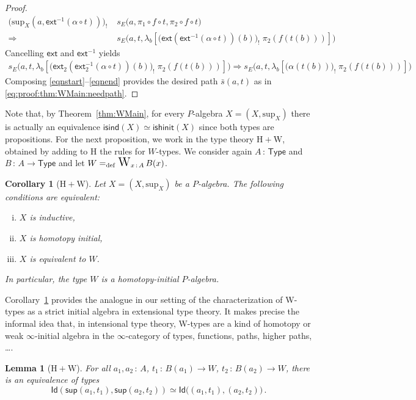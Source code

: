 \documentclass[10pt,a4paper,oneside,reqno]{amsart}
\theoremstyle{mythm}
\newtheorem{lemma}[theorem]{Lemma}
\newtheorem{corollary}[theorem]{Corollary}
\theoremstyle{mydef}
\theoremstyle{myrmk}
\newcommand{\defeq}{=_{\mathrm{def}}}
\newcommand{\co}{\,{:}\,}
\newcommand{\Hint}{\mathrm{H}}
\newcommand{\isalgind}{\mathsf{isind}}
\newcommand{\isalghinit}{\mathsf{ishinit}}
\newcommand{\ext}{\mathsf{ext}}
\newcommand{\Id}{\mathsf{Id}}
\newcommand{\lam}[1]{\lambda_{#1}}
\newcommand{\W}{\mathrm{W}}
\DeclareMathOperator*{\WW}{\text{\Large $\mathrm{W}$}}
\newcommand{\wsup}{\mathsf{sup}}
\newcommand{\U}{\mathsf{Type}}
\renewcommand{\sup}{\mathrm{sup}}
\begin{document}
\begin{proof}
\begin{align*}
\big(\sup_X(a,\ext^{-1}(\alpha \circ t))\big)_{!} \; &s_E\big(a,\pi_1 \circ f \circ t, \pi_2 \circ f \circ t\big)\\
\Rightarrow\ & s_E\big(a,t, \lam{b}[ \big(\ext(\ext^{-1}(\alpha \circ t))(b)\big)_{!} \; \pi_2(f(t(b)))]\big)
\end{align*}
Cancelling $\ext$ and $\ext^{-1}$  yields
\begin{align}
s_E\big(a,t, \lam{b}[ \big(\ext_2(\ext^{-1}_2(\alpha \circ t))(b)\big)_{!} \; \pi_2(f(t(b)))]\big) \Rightarrow s_E\big(a,t, \lam{b}[ \big(\alpha(t(b))\big)_{!} \; \pi_2(f(t(b)))]\big)
 \label{eqnend}
\end{align}
Composing \eqref{eqnstart}--\eqref{eqnend} provides the desired path $\bar{s}(a,t)$ as in \eqref{eq:proof:thm:WMain:needpath}.
\end{proof}



Note that, by Theorem~\ref{thm:WMain}, for every $P$-algebra $X = (X, \sup_X)$ there is actually an equivalence $\isalgind(X) \simeq \isalghinit(X)$ since both types are propositions.  For the next proposition, we work in the type theory $\Hint + \W$, obtained by adding to $\Hint$ the rules for $W$-types.
We consider again $A \co \U$ and $B \co A \to \U$ and let $W \defeq \WW_{x \co A} B(x)$.

\begin{corollary}[$\Hint + \W$]
\label{lem:WInitInt} Let $X = (X, \sup_X)$ be a $P$-algebra. The following conditions are
equivalent:
\begin{enumerate}[(i)]
\item $X$ is inductive,
\item $X$ is homotopy initial,
\item $X$ is equivalent to $W$.
\end{enumerate}
In particular, the type $W$ is a homotopy-initial $P$-algebra.
\end{corollary}


Corollary~\ref{lem:WInitInt} provides the analogue in our setting of the characterization of W-types as a strict initial algebra in extensional type theory. It makes precise the informal idea that, in intensional type theory, W-types are a kind of homotopy or weak $\infty$-initial algebra in the $\infty$-category of types, functions, paths, higher paths, \ldots.  

\begin{lemma}[$\Hint + \W$]\label{lem:suppath}
For all $a_1,a_2 \co A$, $t_1 \co B(a_1) \to W$, $t_2 \co B(a_2) \to W$, there is an equivalence of types
\[ 
\Id ( \wsup(a_1,t_1),  \wsup(a_2,t_2)  ) \simeq  \Id \big( (a_1,t_1), (a_2,t_2) \big) \, . 
\]
\end{lemma}
\end{document}
